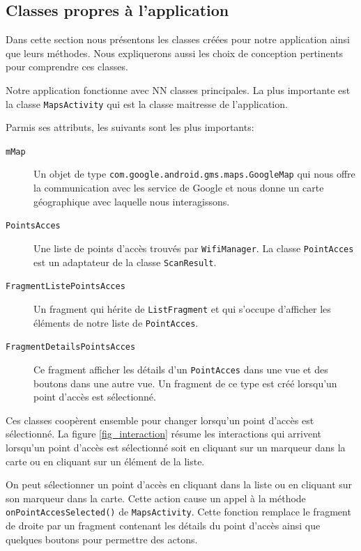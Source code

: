 \documentclass[12pt]{article}
\newcommand\code[1]{\texttt{#1}}
\begin{document}
	\subsection{Classes propres à l'application}

	Dans cette section nous présentons les classes créées pour notre application
	ainsi que leurs méthodes.  Nous expliquerons aussi les choix de conception
	pertinents pour comprendre ces classes.

	Notre application fonctionne avec NN classes principales.  La plus
	importante est la classe \code{MapsActivity} qui est la classe maitresse de
	l'application.

	Parmis ses attributs, les suivants sont les plus importants:
	\begin{description}
		\item[\code{mMap}]

			Un objet de type \code{com.google.android.gms.maps.GoogleMap} qui
			nous offre la communication avec les service de Google et nous donne
			un carte géographique avec laquelle nous interagissons.

		\item[\code{PointsAcces}]

			Une liste de points d'accès trouvés par \code{WifiManager}.  La
			classe \code{PointAcces} est un adaptateur de la classe
			\code{ScanResult}.

		\item[\code{FragmentListePointsAcces}]

			Un fragment qui hérite de \code{ListFragment} et qui s'occupe
			d'afficher les éléments de notre liste de \code{PointAcces}.

		\item[\code{FragmentDetailsPointsAcces}]

			Ce fragment afficher les détails d'un \code{PointAcces} dans une
			vue et des boutons dans une autre vue.  Un fragment de ce type est
			créé lorsqu'un point d'accès est sélectionné.
	\end{description}

	Ces classes coopèrent ensemble pour changer lorsqu'un point d'accès est
	sélectionné.  La figure \ref{fig_interaction} résume les interactions qui
	arrivent lorsqu'un point d'accès est sélectionné soit en cliquant sur un
	marqueur dans la carte ou en cliquant sur un élément de la liste.

	On peut sélectionner un point d'accès en cliquant dans la liste ou en
	cliquant sur son marqueur dans la carte.  Cette action cause un appel à la
	méthode \code{onPointAccesSelected()} de \code{MapsActivity}.  Cette
	fonction remplace le fragment de droite par un fragment contenant les
	détails du point d'accès ainsi que quelques boutons pour permettre des
	actons.
\end{document}
